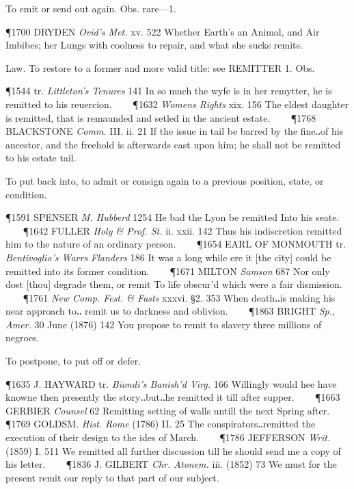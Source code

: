 \begin{description}[wide, labelwidth=!, labelindent=0pt]
\begin{myenumerate}
 To emit or send out again. Obs. rare—1.

\P 1700 DRYDEN  \textit{Ovid's Met.} xv. 522 Whether Earth's an Animal, and Air Imbibes; her Lungs with coolness to repair, and what she sucks remits.

 Law. To restore to a former and more valid title: see REMITTER 1. Obs.

\P 1544 tr.  \textit{Littleton's Tenures} 141 In so much the wyfe is in her remytter, he is remitted to his reuercion.    
\P 1632 \textit{Womens  Rights} xix. 156 The eldest daughter is remitted, that is remaunded and setled in the ancient estate.    
\P 1768 BLACKSTONE  \textit{Comm.} III. ii. 21 If the issue in tail be barred by the fine‥of his ancestor, and the freehold is afterwards cast upon him; he shall not be remitted to his estate tail.

 To put back into, to admit or consign again to a previous position, state, or condition.

\P 1591 SPENSER \textit{M. Hubberd} 1254 He bad  the Lyon be remitted Into his seate.    
\P 1642 FULLER  \textit{Holy \& Prof. St.} ii. xxii. 142 Thus his indiscretion remitted him to the nature of an ordinary person.    
\P 1654 EARL OF MONMOUTH tr. \textit{Bentivoglio's Warrs Flanders} 186 It was a long while ere it [the city] could be remitted into its former condition.    
\P 1671 MILTON  \textit{Samson} 687 Nor only dost [thou] degrade them, or remit To life obscur'd which were a fair dismission.    
\P 1761  \textit{New Comp. Fest. \& Fasts} xxxvi. §2. 353 When death‥is making his near approach to‥ remit us to darkness and oblivion.    
\P 1863 BRIGHT  \textit{Sp., Amer.} 30 June (1876) 142 You propose to remit to slavery three millions of negroes.
 
 To postpone, to put off or defer.

\P 1635 J. HAYWARD tr. \textit{Biondi's Banish'd Virg.} 166 Willingly would hee have knowne then presently the story‥but‥he remitted it till after supper.    
\P 1663 GERBIER  \textit{Counsel} 62 Remitting setting of walls untill the next Spring after.    
\P 1769 GOLDSM.  \textit{Hist. Rome} (1786) II. 25 The conspirators‥remitted the execution of their design to the ides of March.    
\P 1786 JEFFERSON  \textit{Writ.} (1859) I. 511 We remitted all further discussion till he should send me a copy of his letter.    
\P 1836 J. GILBERT  \textit{Chr. Atonem.} iii. (1852) 73 We must for the present remit our reply to that part of our subject.


\end{myenumerate}
\end{description}
